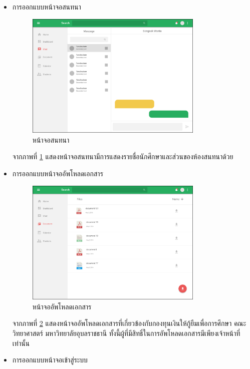 \begin{enumerate}
\begin{itemize}
\begin{itemize}
				\item การออกแบบหน้าจอสนทนา
				\begin{figure}[H]
					\centering
					\includegraphics[width=0.8\textwidth]{Figures/3/UIWeb/Chat}
					\caption{หน้าจอสนทนา}
					\label{Fig:Chat}
				\end{figure}
				จากภาพที่ \ref{Fig:Chat}  แสดงหน้าจอสนทนามีการแสดงรายชื่อนักศึกษาและส่วนของห้องสนทนาด้วย
				\item การออกแบบหน้าจออัพโหลดเอกสาร
				\begin{figure}[H]
					\centering
					\includegraphics[width=0.8\textwidth]{Figures/3/UIWeb/Doc}
					\caption{หน้าจออัพโหลดเอกสาร}
					\label{Fig:Doc}
				\end{figure}
				จากภาพที่ \ref{Fig:Doc}  แสดงหน้าจออัพโหลดเอกสารที่เกี่ยวข้องกับกองทุนเงินให้กู้ยืมเพื่อการศึกษา คณะวิทยาศาสตร์ มหาวิทยาลัยอุบลราชธานี ทั้งนี้ผู้ที่มีสิทธิ์ในการอัพโหลดเอกสารมีเพียงเจ้าหน้าที่เท่านั้น
				\item การออกแบบหน้าจอเข้าสู่ระบบ
				\begin{figure}[H]
					\centering

\end{figure}
\end{itemize}
\end{itemize}
\end{enumerate}
